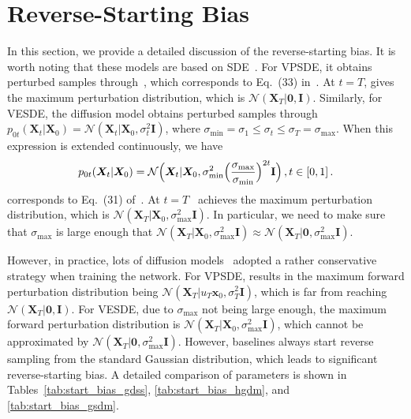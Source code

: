 \documentclass{article}
\newcommand{\x}{{{\bm x}}}
\newcommand{\X}{{{\bm X}}}
\begin{document}
\section{Reverse-Starting Bias}\label{appendix:A.reverse_starting_bias}
In this section, we provide a detailed discussion of the reverse-starting bias. It is worth noting that these models are based on SDE~\citep{song2021scorebased}. For VPSDE, it obtains perturbed samples through~, which corresponds to Eq.~(33) in~\citep{song2021scorebased}. At $t=T$,  gives the maximum perturbation distribution, which is $\mathcal{N}\left(\X_T|\textbf{0},\mathbf{I}\right)$. Similarly, for VESDE, the diffusion model obtains perturbed samples through $p_{0t}(\X_t | \X_0)= \mathcal{N}(\X_t| \X_0, \sigma_t^2\mathbf{I})$, where $\sigma_{\min}=\sigma_1\leq\sigma_t\leq\sigma_T=\sigma_{\max}$. When this expression is extended continuously, we have
\begin{align}
p_{0t}(\X_t | \X_0) 
= \mathcal{N}
\Bigr(\X_t| \X_0, \sigma_{\min}^2\Bigl(\frac{\sigma_{\max}}{\sigma_{\min}}\Bigr)^{2t}\mathbf{I}\Bigr)\,,t\in[0,1]\,.
\label{eq:ve perturbation kernel}
\end{align}
 corresponds to Eq.~(31) of~\citep{song2021scorebased}. At $t=T$~ achieves the maximum perturbation distribution, which is $\mathcal{N}(\X_T| \X_0, \sigma_{\max}^2\mathbf{I})$. In particular, we need to make sure that $\sigma_{\max}$ is large enough that $\mathcal{N}(\X_T| \X_0, \sigma_{\max}^2\mathbf{I}) \approx \mathcal{N}(\X_T| \textbf{0}, \sigma_{\max}^2\mathbf{I})$.

However, in practice, lots of diffusion models~\citep{jo2022GDSS, luo2023fast, wen2024hyperbolic} adopted a rather conservative strategy when training the network. For VPSDE, results in the maximum forward perturbation distribution being $\mathcal{N}(\X_T|u_T\x_0,\sigma_T^2\mathbf{I})$, which is far from reaching $\mathcal{N}\left(\X_T|\mathbf{0},\mathbf{I}\right)$. For VESDE, due to $\sigma_{\max}$ not being large enough, the maximum forward perturbation distribution is $\mathcal{N}(\X_T| \X_0, \sigma_{\max}^2\mathbf{I})$, which cannot be approximated by $\mathcal{N}(\X_T| \textbf{0}, \sigma_{\max}^2\mathbf{I})$. However, baselines always start reverse sampling from the standard Gaussian distribution, which leads to significant reverse-starting bias. A detailed comparison of parameters is shown in Tables~\ref{tab:start_bias_gdss}, \ref{tab:start_bias_hgdm}, and \ref{tab:start_bias_gsdm}.
\end{document}
